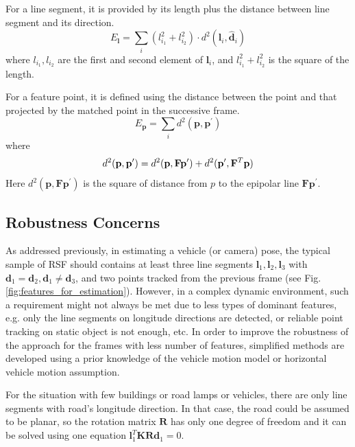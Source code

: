 \documentclass[letterpaper, 10 pt, conference]{ieeeconf}  %
\begin{document}
For a line segment, it is provided by its length plus the distance between line segment and its direction.
\begin{equation}
E_\mathbf{l} = \sum_{i} \left(l_{i_1}^2+l_{i_2}^2\right) \cdot d^2(\mathbf{l}_i,\hat{\mathbf{d}}_i)
\end{equation}
where $l_{i_1},l_{i_2}$ are the first and second element of $\mathbf{l}_i$, and $l_{i_1}^2+l_{i_2}^2$ is the square of the length.

For a feature point, it is defined using the distance between the point and that projected by the matched point in the successive frame.
\begin{equation}
E_\mathbf{p} = \sum_{i} d^2(\mathbf{p}, \mathbf{p}^\prime)
\end{equation}
where
\begin{equation}
d^2(\mathbf{p}, \mathbf{p}^\prime)
= d^2 (\mathbf{p}, \mathbf{F} \mathbf{p}^\prime)
+ d^2 (\mathbf{p}^\prime, \mathbf{F}^T\mathbf{p}) \\
\end{equation}
Here $d^2 (\mathbf{p}, \mathbf{F} \mathbf{p}^\prime)$ is the square of distance from $p$ to the epipolar line $\mathbf{F} \mathbf{p}^\prime$.

\subsection{Robustness Concerns}
As addressed previously, in estimating a vehicle (or camera) pose, the typical sample of RSF should contains at least three line segments $\mathbf{l}_1,\mathbf{l}_2,\mathbf{l}_3$ with $\mathbf{d}_1=\mathbf{d}_2,\mathbf{d}_1\neq \mathbf{d}_3$, and two points tracked from the previous frame (see Fig. \ref{fig:features_for_estimation}).
However, in a complex dynamic environment, such a requirement might not always be met due to less types of dominant features, e.g. only the line segments on longitude directions are detected, or reliable point tracking on static object is not enough, etc. In order to improve the robustness of the approach for the frames with less number of features, simplified methods are developed using a prior knowledge of the vehicle motion model or horizontal vehicle motion assumption.

For the situation with few buildings or road lamps or vehicles, there are only line segments with road's longitude direction. In that case, the road could be assumed to be planar, so the rotation matrix $\mathbf{R}$ has only one degree of freedom and it can be solved using one equation $\mathbf{l}_1^T\mathbf{K}\mathbf{R}\mathbf{d}_1=0$.
\end{document}
